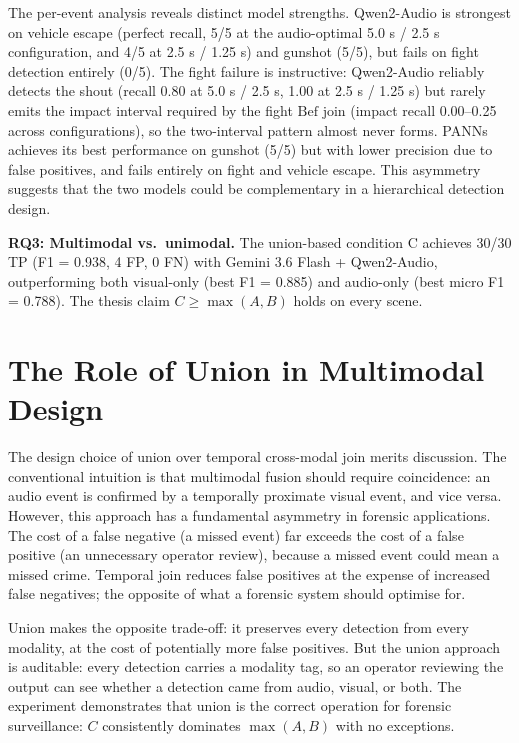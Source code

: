 The per-event analysis reveals distinct model strengths. Qwen2-Audio is strongest on vehicle escape (perfect recall, 5/5 at the audio-optimal 5.0 s / 2.5 s configuration, and 4/5 at 2.5 s / 1.25 s) and gunshot (5/5), but fails on fight detection entirely (0/5). The fight failure is instructive: Qwen2-Audio reliably detects the shout (recall 0.80 at 5.0 s / 2.5 s, 1.00 at 2.5 s / 1.25 s) but rarely emits the impact interval required by the fight $\mathrm{Bef}$ join (impact recall 0.00--0.25 across configurations), so the two-interval pattern almost never forms. PANNs achieves its best performance on gunshot (5/5) but with lower precision due to false positives, and fails entirely on fight and vehicle escape. This asymmetry suggests that the two models could be complementary in a hierarchical detection design.

\textbf{RQ3: Multimodal vs.\ unimodal.} The union-based condition C achieves 30/30 TP (F1 = 0.938, 4 FP, 0 FN) with Gemini 3.6 Flash + Qwen2-Audio, outperforming both visual-only (best F1 = 0.885) and audio-only (best micro F1 = 0.788). The thesis claim $C \ge \max(A, B)$ holds on every scene.

\section{The Role of Union in Multimodal Design}
\label{sec:disc-union}

The design choice of union over temporal cross-modal join merits discussion. The conventional intuition is that multimodal fusion should require coincidence: an audio event is confirmed by a temporally proximate visual event, and vice versa. However, this approach has a fundamental asymmetry in forensic applications. The cost of a false negative (a missed event) far exceeds the cost of a false positive (an unnecessary operator review), because a missed event could mean a missed crime. Temporal join reduces false positives at the expense of increased false negatives; the opposite of what a forensic system should optimise for.

Union makes the opposite trade-off: it preserves every detection from every modality, at the cost of potentially more false positives. But the union approach is auditable: every detection carries a modality tag, so an operator reviewing the output can see whether a detection came from audio, visual, or both. The experiment demonstrates that union is the correct operation for forensic surveillance: $C$ consistently dominates $\max(A, B)$ with no exceptions.

